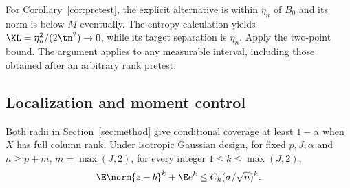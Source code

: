 For Corollary~\ref{cor:pretest}, the explicit alternative is within $\eta_n$ of $B_0$ and its norm is below $M$ eventually. The entropy calculation yields $\KL=\eta_n^2/(2\tn^2)\to0$, while its target separation is $\eta_n$. Apply the two-point bound. The argument applies to any measurable interval, including those obtained after an arbitrary rank pretest.

\subsection{Localization and moment control}
\begin{lemma}\label{lem:OLS}
Both radii in Section~\ref{sec:method} give conditional coverage at least $1-\alpha$ when $X$ has full column rank. Under isotropic Gaussian design, for fixed $p,J,\alpha$ and $n\ge p+m$, $m=\max(J,2)$, for every integer $1\le k\le\max(J,2)$,
\[
 \E\norm{z-b}^k+\E e^k\le C_k(\sigma/\sqrt n)^k.
\]
\end{lemma}

